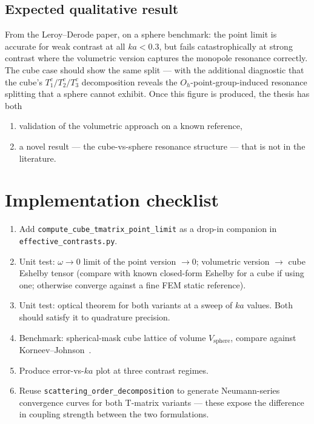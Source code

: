 \documentclass[11pt,a4paper]{article}
\newcommand{\Oh}{O_h}
\begin{document}
\subsection{Expected qualitative result}

From the Leroy--Derode paper, on a sphere benchmark: the point limit
is accurate for weak contrast at all $ka < 0.3$, but fails
catastrophically at strong contrast where the volumetric version
captures the monopole resonance correctly. The cube case should
show the same split --- with the additional diagnostic that the
cube's $T_1^c / T_2^c / T_3^c$ decomposition reveals the
$\Oh$-point-group-induced resonance splitting that a sphere cannot
exhibit. Once this figure is produced, the thesis has both
\begin{enumerate}[nosep]
  \item validation of the volumetric approach on a known reference,
  \item a novel result --- the cube-vs-sphere resonance structure ---
        that is not in the literature.
\end{enumerate}

\section{Implementation checklist}

\begin{enumerate}[leftmargin=1.8em]
  \item Add \texttt{compute\_cube\_tmatrix\_point\_limit} as a
        drop-in companion in \texttt{effective\_contrasts.py}.
  \item Unit test: $\omega \to 0$ limit of the point version
        $\to 0$; volumetric version $\to$ cube Eshelby tensor
        (compare with known closed-form Eshelby for a cube if using
        one; otherwise converge against a fine FEM static reference).
  \item Unit test: optical theorem for both variants at a sweep of
        $ka$ values. Both should satisfy it to quadrature precision.
  \item Benchmark: spherical-mask cube lattice of volume
        $V_{\text{sphere}}$, compare against
        Korneev--Johnson~\cite{KorneevJohnson1993}.
  \item Produce error-vs-$ka$ plot at three contrast regimes.
  \item Reuse \texttt{scattering\_order\_decomposition} to generate
        Neumann-series convergence curves for both T-matrix variants
        --- these expose the difference in coupling strength between
        the two formulations.
\end{enumerate}
\end{document}
